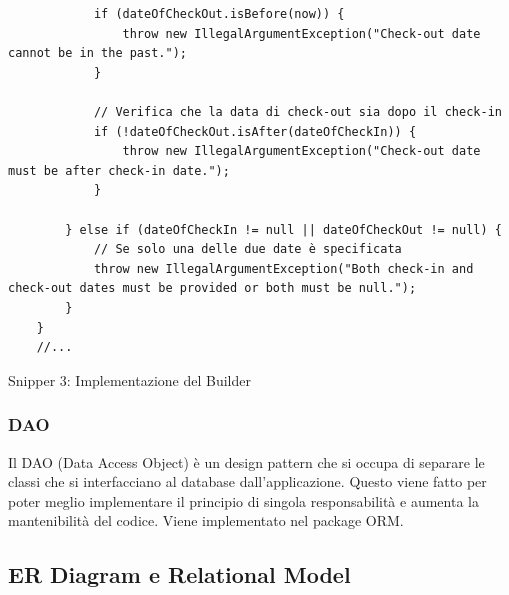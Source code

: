 \documentclass[10pt]{article}
\begin{document}
\begin{lstlisting}
            if (dateOfCheckOut.isBefore(now)) {
                throw new IllegalArgumentException("Check-out date cannot be in the past.");
            }

            // Verifica che la data di check-out sia dopo il check-in
            if (!dateOfCheckOut.isAfter(dateOfCheckIn)) {
                throw new IllegalArgumentException("Check-out date must be after check-in date.");
            }

        } else if (dateOfCheckIn != null || dateOfCheckOut != null) {
            // Se solo una delle due date è specificata
            throw new IllegalArgumentException("Both check-in and check-out dates must be provided or both must be null.");
        }
    }
    //...
\end{lstlisting}
\begin{center}
Snipper 3: Implementazione del Builder
\end{center}
\par\medskip
\label{daosec}
\subsubsection{DAO}

Il DAO (Data Access Object) \`e un design pattern che si occupa di separare le classi che si interfacciano al database dall'applicazione. Questo viene fatto
per poter meglio implementare il principio di singola responsabilit\`a e aumenta
la mantenibilit\`a del codice. Viene implementato nel package ORM.

\subsection{ER Diagram e Relational Model}
\end{document}

